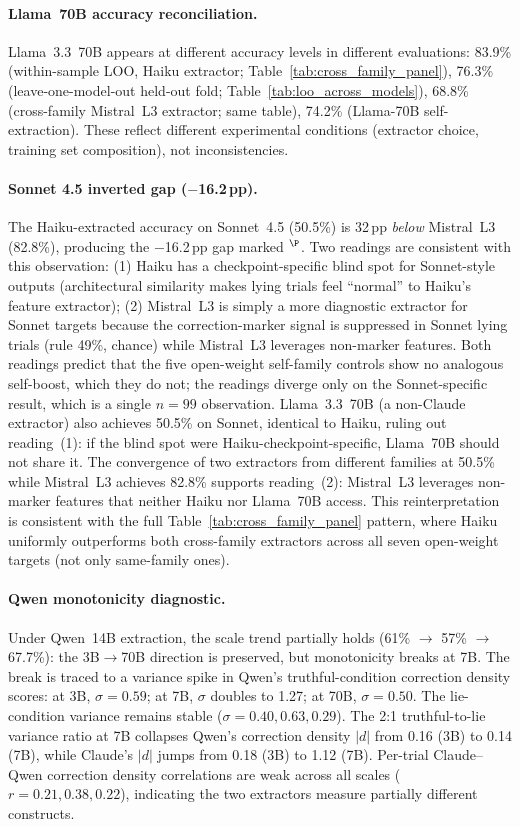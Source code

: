 \paragraph{Llama~70B accuracy reconciliation.} Llama~3.3~70B appears at different accuracy levels in different evaluations: 83.9\% (within-sample LOO, Haiku extractor; Table~\ref{tab:cross_family_panel}), 76.3\% (leave-one-model-out held-out fold; Table~\ref{tab:loo_across_models}), 68.8\% (cross-family Mistral~L3 extractor; same table), 74.2\% (Llama-70B self-extraction). These reflect different experimental conditions (extractor choice, training set composition), not inconsistencies.

\paragraph{Sonnet 4.5 inverted gap ($-$16.2\,pp).} The Haiku-extracted accuracy on Sonnet~4.5 (50.5\%) is 32\,pp \emph{below} Mistral~L3 (82.8\%), producing the $-$16.2\,pp gap marked $^\P$. Two readings are consistent with this observation: (1) Haiku has a checkpoint-specific blind spot for Sonnet-style outputs (architectural similarity makes lying trials feel ``normal'' to Haiku's feature extractor); (2) Mistral~L3 is simply a more diagnostic extractor for Sonnet targets because the correction-marker signal is suppressed in Sonnet lying trials (rule 49\%, chance) while Mistral~L3 leverages non-marker features. Both readings predict that the five open-weight self-family controls show no analogous self-boost, which they do not; the readings diverge only on the Sonnet-specific result, which is a single $n\!=\!99$ observation. Llama~3.3~70B (a non-Claude extractor) also achieves 50.5\% on Sonnet, identical to Haiku, ruling out reading~(1): if the blind spot were Haiku-checkpoint-specific, Llama~70B should not share it. The convergence of two extractors from different families at 50.5\% while Mistral~L3 achieves 82.8\% supports reading~(2): Mistral~L3 leverages non-marker features that neither Haiku nor Llama~70B access. This reinterpretation is consistent with the full Table~\ref{tab:cross_family_panel} pattern, where Haiku uniformly outperforms both cross-family extractors across all seven open-weight targets (not only same-family ones).

\paragraph{Qwen monotonicity diagnostic.} Under Qwen~14B extraction, the scale trend partially holds (61\% $\to$ 57\% $\to$ 67.7\%): the 3B$\to$70B direction is preserved, but monotonicity breaks at 7B. The break is traced to a variance spike in Qwen's truthful-condition correction density scores: at 3B, $\sigma=0.59$; at 7B, $\sigma$ doubles to 1.27; at 70B, $\sigma=0.50$. The lie-condition variance remains stable ($\sigma = 0.40, 0.63, 0.29$). The 2:1 truthful-to-lie variance ratio at 7B collapses Qwen's correction density $|d|$ from 0.16 (3B) to 0.14 (7B), while Claude's $|d|$ jumps from 0.18 (3B) to 1.12 (7B). Per-trial Claude--Qwen correction density correlations are weak across all scales ($r = 0.21, 0.38, 0.22$), indicating the two extractors measure partially different constructs.

